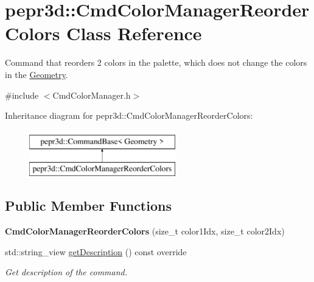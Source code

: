 \hypertarget{classpepr3d_1_1_cmd_color_manager_reorder_colors}{}\section{pepr3d\+::Cmd\+Color\+Manager\+Reorder\+Colors Class Reference}
\label{classpepr3d_1_1_cmd_color_manager_reorder_colors}


Command that reorders 2 colors in the palette, which does not change the colors in the \mbox{\hyperlink{classpepr3d_1_1_geometry}{Geometry}}.  




{\ttfamily \#include $<$Cmd\+Color\+Manager.\+h$>$}

Inheritance diagram for pepr3d\+::Cmd\+Color\+Manager\+Reorder\+Colors\+:\begin{figure}[H]
\begin{center}
\leavevmode
\includegraphics[height=2.000000cm]{classpepr3d_1_1_cmd_color_manager_reorder_colors}
\end{center}
\end{figure}
\subsection*{Public Member Functions}
\begin{DoxyCompactItemize}
\item 
\mbox{\label{classpepr3d_1_1_cmd_color_manager_reorder_colors_a81dcf3c2b7affe3aef6fa8688be8edb7}} 
{\bfseries Cmd\+Color\+Manager\+Reorder\+Colors} (size\+\_\+t color1\+Idx, size\+\_\+t color2\+Idx)
\item 
\mbox{\label{classpepr3d_1_1_cmd_color_manager_reorder_colors_a165bc96ee062a1f4f35f3d34b6039fe1}} 
std\+::string\+\_\+view \mbox{\hyperlink{classpepr3d_1_1_cmd_color_manager_reorder_colors_a165bc96ee062a1f4f35f3d34b6039fe1}{get\+Description}} () const override
\begin{DoxyCompactList}\small\item\em Get description of the command. \end{DoxyCompactList}\end{DoxyCompactItemize}
